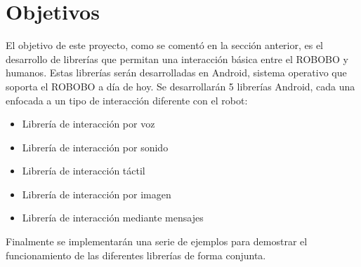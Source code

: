  \section{Objetivos}
 \label{sec:intro-objetives}
 El objetivo de este proyecto, como se comentó en la sección anterior, es el desarrollo de librerías que permitan una interacción básica entre el ROBOBO y humanos. Estas librerías serán desarrolladas en Android, sistema operativo que soporta el ROBOBO a día de hoy. Se desarrollarán 5 librerías Android, cada una enfocada a un tipo de interacción diferente con el robot:
 \begin{itemize}
 	\item Librería de interacción por voz
 	\item Librería de interacción por sonido
 	\item Librería de interacción táctil
 	\item Librería de interacción por imagen
 	\item Librería de interacción mediante mensajes
 \end{itemize} 
 Finalmente se implementarán una serie de ejemplos para demostrar el funcionamiento de las diferentes librerías de forma conjunta.
